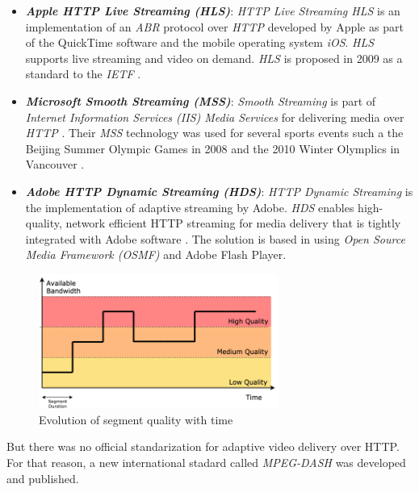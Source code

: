 \begin{itemize}[topsep=0.5pt]
  \setlength\itemsep{0.5pt}
  \item \textbf{\textit{Apple HTTP Live Streaming (HLS)}}: \textit{HTTP Live Streaming HLS}
  is an implementation of an \textit{ABR} protocol over \textit{HTTP} developed by Apple \cite{hls1}
  as part of the QuickTime software and the mobile operating system \textit{iOS}. \textit{HLS} 
  supports live streaming and video on demand. \textit{HLS} is proposed in 2009 as a standard to
  the \textit{IETF} \cite{hls2}.
  \item \textbf{\textit{Microsoft Smooth Streaming (MSS)}}: \textit{Smooth Streaming} is part
  of \textit{Internet Information Services (IIS) Media Services} for delivering media over
  \textit{HTTP} \cite{mss1}. Their \textit{MSS} technology was used for several
  sports events such a the Beijing Summer Olympic Games in 2008 and the 2010 Winter Olymplics
  in Vancouver \cite{mss2}.
  \item \textbf{\textit{Adobe HTTP Dynamic Streaming (HDS)}}: \textit{HTTP Dynamic Streaming}
  is the implementation of adaptive streaming by Adobe. \textit{HDS} enables high-quality, network
  efficient HTTP streaming for media delivery that is tightly integrated with Adobe software \cite{hds1}. The
  solution is based in using \textit{Open Source Media Framework (OSMF)} and Adobe Flash Player.
\end{itemize}

\begin{figure}[h]
  \centering
  \includegraphics[width=0.7\textwidth]{img/abrtime.png}
  \caption{Evolution of segment quality with time}
  \label{fig:abrtime}

\end{figure}

But there was no official standarization for adaptive video delivery over HTTP. For that reason,
a new international stadard called \textit{MPEG-DASH} was developed and published.

